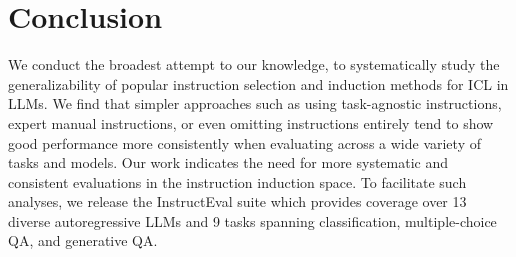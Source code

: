 \section{Conclusion}
We conduct the broadest attempt to our knowledge, to systematically study the generalizability of popular instruction selection and induction methods for ICL in LLMs. We find that simpler approaches such as using task-agnostic instructions, expert manual instructions, or even omitting instructions entirely tend to show good performance more consistently when evaluating across a wide variety of tasks and models. Our work indicates the need for more systematic and consistent evaluations in the instruction induction space. To facilitate such analyses, we release the InstructEval suite which provides coverage over 13 diverse autoregressive LLMs and 9 tasks spanning classification, multiple-choice QA, and generative QA.